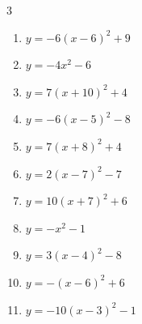 \begin{multicols}{3}
\begin{enumerate}
        \phantom{$\displaystyle 頂点\left( 6 , -2 \right)$}

  \item $\displaystyle y=-6\left( x-6\right)^{2}+9$

        \phantom{$\displaystyle 頂点\left( 6 , 9 \right)$}

\columnbreak %

\resetques

  \item $\displaystyle y=-4x^{2}-6$

        \phantom{$\displaystyle 頂点\left( 0 , -6 \right)$}

  \item $\displaystyle y=7\left( x+10\right)^{2}+4$

        \phantom{$\displaystyle 頂点\left( -10 , 4 \right)$}

  \item $\displaystyle y=-6\left( x-5\right)^{2}-8$

        \phantom{$\displaystyle 頂点\left( 5 , -8 \right)$}

  \item $\displaystyle y=7\left( x+8\right)^{2}+4$

        \phantom{$\displaystyle 頂点\left( -8 , 4 \right)$}

  \item $\displaystyle y=2\left( x-7\right)^{2}-7$

        \phantom{$\displaystyle 頂点\left( 7 , -7 \right)$}

  \item $\displaystyle y=10\left( x+7\right)^{2}+6$

        \phantom{$\displaystyle 頂点\left( -7 , 6 \right)$}

  \item $\displaystyle y=-x^{2}-1$

        \phantom{$\displaystyle 頂点\left( 0 , -1 \right)$}

  \item $\displaystyle y=3\left( x-4\right)^{2}-8$

        \phantom{$\displaystyle 頂点\left( 4 , -8 \right)$}

  \item $\displaystyle y=-\left( x-6\right)^{2}+6$

        \phantom{$\displaystyle 頂点\left( 6 , 6 \right)$}

  \item $\displaystyle y=-10\left( x-3\right)^{2}-1$


\end{enumerate}
\end{multicols}

